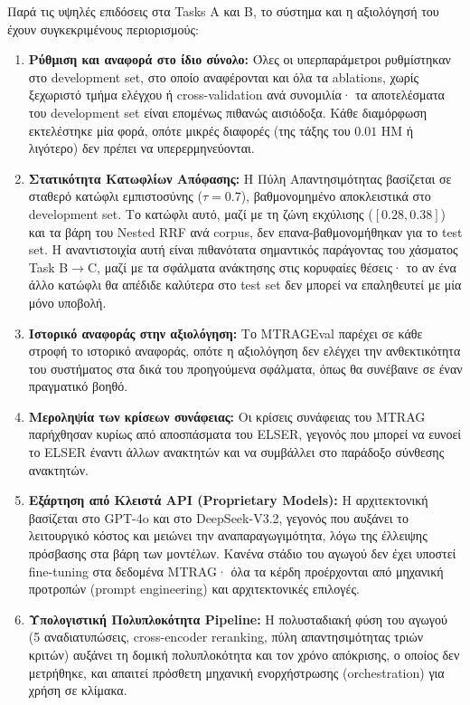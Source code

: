 Παρά τις υψηλές επιδόσεις στα Tasks A και B, το σύστημα και η αξιολόγησή του έχουν συγκεκριμένους περιορισμούς:
\begin{enumerate}
    \item \textbf{Ρύθμιση και αναφορά στο ίδιο σύνολο:} Όλες οι υπερπαράμετροι ρυθμίστηκαν στο development set, στο οποίο αναφέρονται και όλα τα ablations, χωρίς ξεχωριστό τμήμα ελέγχου ή cross-validation ανά συνομιλία· τα αποτελέσματα του development set είναι επομένως πιθανώς αισιόδοξα. Κάθε διαμόρφωση εκτελέστηκε μία φορά, οπότε μικρές διαφορές (της τάξης του $0.01$ HM ή λιγότερο) δεν πρέπει να υπερερμηνεύονται.
    \item \textbf{Στατικότητα Κατωφλίων Απόφασης:} Η Πύλη Απαντησιμότητας βασίζεται σε σταθερό κατώφλι εμπιστοσύνης ($\tau=0.7$), βαθμονομημένο αποκλειστικά στο development set. Το κατώφλι αυτό, μαζί με τη ζώνη εκχύλισης ($[0.28, 0.38]$) και τα βάρη του Nested RRF ανά corpus, δεν επανα-βαθμονομήθηκαν για το test set. Η αναντιστοιχία αυτή είναι πιθανότατα σημαντικός παράγοντας του χάσματος Task B$\rightarrow$C, μαζί με τα σφάλματα ανάκτησης στις κορυφαίες θέσεις· το αν ένα άλλο κατώφλι θα απέδιδε καλύτερα στο test set δεν μπορεί να επαληθευτεί με μία μόνο υποβολή.
    \item \textbf{Ιστορικό αναφοράς στην αξιολόγηση:} Το MTRAGEval παρέχει σε κάθε στροφή το ιστορικό αναφοράς, οπότε η αξιολόγηση δεν ελέγχει την ανθεκτικότητα του συστήματος στα δικά του προηγούμενα σφάλματα, όπως θα συνέβαινε σε έναν πραγματικό βοηθό.
    \item \textbf{Μεροληψία των κρίσεων συνάφειας:} Οι κρίσεις συνάφειας του MTRAG παρήχθησαν κυρίως από αποσπάσματα του ELSER, γεγονός που μπορεί να ευνοεί το ELSER έναντι άλλων ανακτητών και να συμβάλλει στο παράδοξο σύνθεσης ανακτητών.
    \item \textbf{Εξάρτηση από Κλειστά API (Proprietary Models):} Η αρχιτεκτονική βασίζεται στο GPT-4o και στο DeepSeek-V3.2, γεγονός που αυξάνει το λειτουργικό κόστος και μειώνει την αναπαραγωγιμότητα, λόγω της έλλειψης πρόσβασης στα βάρη των μοντέλων. Κανένα στάδιο του αγωγού δεν έχει υποστεί fine-tuning στα δεδομένα MTRAG· όλα τα κέρδη προέρχονται από μηχανική προτροπών (prompt engineering) και αρχιτεκτονικές επιλογές.
    \item \textbf{Υπολογιστική Πολυπλοκότητα Pipeline:} Η πολυσταδιακή φύση του αγωγού (5 αναδιατυπώσεις, cross-encoder reranking, πύλη απαντησιμότητας τριών κριτών) αυξάνει τη δομική πολυπλοκότητα και τον χρόνο απόκρισης, ο οποίος δεν μετρήθηκε, και απαιτεί πρόσθετη μηχανική ενορχήστρωσης (orchestration) για χρήση σε κλίμακα.
\end{enumerate}


